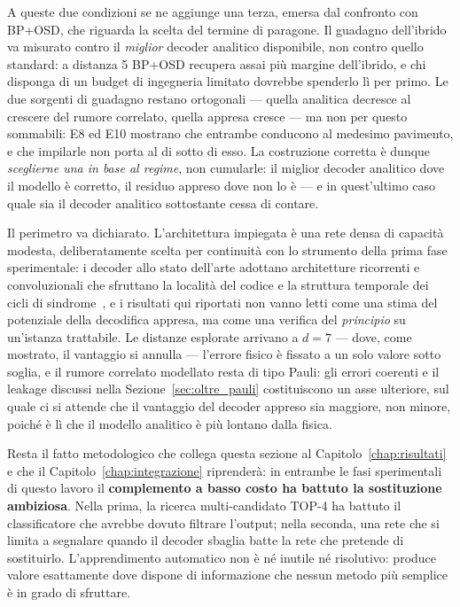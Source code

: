 A queste due condizioni se ne aggiunge una terza, emersa dal confronto con BP+OSD, che riguarda la scelta del termine di paragone. Il guadagno dell'ibrido va misurato contro il \emph{miglior} decoder analitico disponibile, non contro quello standard: a distanza 5 BP+OSD recupera assai più margine dell'ibrido, e chi disponga di un budget di ingegneria limitato dovrebbe spenderlo lì per primo. Le due sorgenti di guadagno restano ortogonali --- quella analitica decresce al crescere del rumore correlato, quella appresa cresce --- ma non per questo sommabili: E8 ed E10 mostrano che entrambe conducono al medesimo pavimento, e che impilarle non porta al di sotto di esso. La costruzione corretta è dunque \emph{sceglierne una in base al regime}, non cumularle: il miglior decoder analitico dove il modello è corretto, il residuo appreso dove non lo è --- e in quest'ultimo caso quale sia il decoder analitico sottostante cessa di contare.

Il perimetro va dichiarato. L'architettura impiegata è una rete densa di capacità modesta, deliberatamente scelta per continuità con lo strumento della prima fase sperimentale: i decoder allo stato dell'arte adottano architetture ricorrenti e convoluzionali che sfruttano la località del codice e la struttura temporale dei cicli di sindrome~\cite{alphaqubit2024}, e i risultati qui riportati non vanno letti come una stima del potenziale della decodifica appresa, ma come una verifica del \emph{principio} su un'istanza trattabile. Le distanze esplorate arrivano a $d=7$ --- dove, come mostrato, il vantaggio si annulla --- l'errore fisico è fissato a un solo valore sotto soglia, e il rumore correlato modellato resta di tipo Pauli: gli errori coerenti e il leakage discussi nella Sezione~\ref{sec:oltre_pauli} costituiscono un asse ulteriore, sul quale ci si attende che il vantaggio del decoder appreso sia maggiore, non minore, poiché è lì che il modello analitico è più lontano dalla fisica.

Resta il fatto metodologico che collega questa sezione al Capitolo~\ref{chap:risultati} e che il Capitolo~\ref{chap:integrazione} riprenderà: in entrambe le fasi sperimentali di questo lavoro il \textbf{complemento a basso costo ha battuto la sostituzione ambiziosa}. Nella prima, la ricerca multi-candidato TOP-4 ha battuto il classificatore che avrebbe dovuto filtrare l'output; nella seconda, una rete che si limita a segnalare quando il decoder sbaglia batte la rete che pretende di sostituirlo. L'apprendimento automatico non è né inutile né risolutivo: produce valore esattamente dove dispone di informazione che nessun metodo più semplice è in grado di sfruttare.
